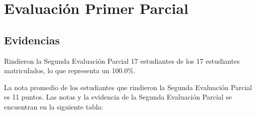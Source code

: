 \chapter{Evaluación Primer Parcial}
\newpage

%
%
%

\pagestyle{empty} %

\section{Evidencias}
Rindieron la Segunda Evaluación Parcial 17 estudiantes de los 17 estudiantes matriculados, lo que representa un 100.0\%.

La nota promedio de los estudiantes que rindieron la Segunda Evaluación Parcial es 11 puntos. Las notas y la evidencia de la Segunda Evaluación Parcial se encuentran en la siguiente tabla:


